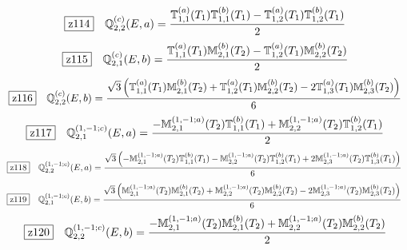 \documentclass[fleqn,10pt,landscape]{jsarticle}
\begin{document}
\begin{dmath*}
\hspace*{3mm}\fbox{z114}\quad \mathbb{Q}_{2,2}^{(c)}(E,a)=\frac{\mathbb{T}_{1,1}^{(a)}(T_{1}) \mathbb{T}_{1,1}^{(b)}(T_{1}) - \mathbb{T}_{1,2}^{(a)}(T_{1}) \mathbb{T}_{1,2}^{(b)}(T_{1})}{2}
\end{dmath*}
\begin{dmath*}
\hspace*{3mm}\fbox{z115}\quad \mathbb{Q}_{2,1}^{(c)}(E,b)=\frac{\mathbb{T}_{1,1}^{(a)}(T_{1}) \mathbb{M}_{2,1}^{(b)}(T_{2}) - \mathbb{T}_{1,2}^{(a)}(T_{1}) \mathbb{M}_{2,2}^{(b)}(T_{2})}{2}
\end{dmath*}
\begin{dmath*}
\hspace*{3mm}\fbox{z116}\quad \mathbb{Q}_{2,2}^{(c)}(E,b)=\frac{\sqrt{3} \left(\mathbb{T}_{1,1}^{(a)}(T_{1}) \mathbb{M}_{2,1}^{(b)}(T_{2}) + \mathbb{T}_{1,2}^{(a)}(T_{1}) \mathbb{M}_{2,2}^{(b)}(T_{2}) - 2 \mathbb{T}_{1,3}^{(a)}(T_{1}) \mathbb{M}_{2,3}^{(b)}(T_{2})\right)}{6}
\end{dmath*}
\begin{dmath*}
\hspace*{3mm}\fbox{z117}\quad \mathbb{Q}_{2,1}^{(1,-1;c)}(E,a)=\frac{- \mathbb{M}_{2,1}^{(1,-1;a)}(T_{2}) \mathbb{T}_{1,1}^{(b)}(T_{1}) + \mathbb{M}_{2,2}^{(1,-1;a)}(T_{2}) \mathbb{T}_{1,2}^{(b)}(T_{1})}{2}
\end{dmath*}
\begin{dmath*}
\hspace*{3mm}\fbox{z118}\quad \mathbb{Q}_{2,2}^{(1,-1;c)}(E,a)=\frac{\sqrt{3} \left(- \mathbb{M}_{2,1}^{(1,-1;a)}(T_{2}) \mathbb{T}_{1,1}^{(b)}(T_{1}) - \mathbb{M}_{2,2}^{(1,-1;a)}(T_{2}) \mathbb{T}_{1,2}^{(b)}(T_{1}) + 2 \mathbb{M}_{2,3}^{(1,-1;a)}(T_{2}) \mathbb{T}_{1,3}^{(b)}(T_{1})\right)}{6}
\end{dmath*}
\begin{dmath*}
\hspace*{3mm}\fbox{z119}\quad \mathbb{Q}_{2,1}^{(1,-1;c)}(E,b)=\frac{\sqrt{3} \left(\mathbb{M}_{2,1}^{(1,-1;a)}(T_{2}) \mathbb{M}_{2,1}^{(b)}(T_{2}) + \mathbb{M}_{2,2}^{(1,-1;a)}(T_{2}) \mathbb{M}_{2,2}^{(b)}(T_{2}) - 2 \mathbb{M}_{2,3}^{(1,-1;a)}(T_{2}) \mathbb{M}_{2,3}^{(b)}(T_{2})\right)}{6}
\end{dmath*}
\begin{dmath*}
\hspace*{3mm}\fbox{z120}\quad \mathbb{Q}_{2,2}^{(1,-1;c)}(E,b)=\frac{- \mathbb{M}_{2,1}^{(1,-1;a)}(T_{2}) \mathbb{M}_{2,1}^{(b)}(T_{2}) + \mathbb{M}_{2,2}^{(1,-1;a)}(T_{2}) \mathbb{M}_{2,2}^{(b)}(T_{2})}{2}
\end{dmath*}
\end{document}
